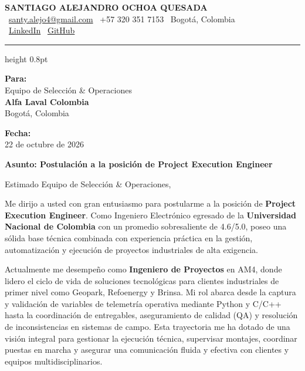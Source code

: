 \documentclass[11pt,a4paper]{article}
\begin{document}
\thispagestyle{empty}
\color{darktext}

\begin{center}
    {\Huge \bfseries\color{accent} SANTIAGO ALEJANDRO OCHOA QUESADA} \\[6pt]
    {\small\color{darktext}
    \faEnvelope\ \href{mailto:santy.alejo4@gmail.com}{santy.alejo4@gmail.com}
    \quad\textcolor{bulletline}{\textbar}\quad
    \faPhone\ +57 320 351 7153
    \quad\textcolor{bulletline}{\textbar}\quad
    \faMapMarker*\ Bogotá, Colombia \\[4pt]
    \faLinkedin\ \href{https://linkedin.com/in/santiago-alejandro-ochoa-quesada-a07a18288/}{LinkedIn}
    \quad\textcolor{bulletline}{\textbar}\quad
    \faGithub\ \href{https://github.com/Sochoaq}{GitHub}
    }
\end{center}
\vspace{2pt}
{\color{bulletline}\hrule height 0.8pt}
\vspace{10pt}

\noindent
\begin{minipage}[t]{0.62\textwidth}
    \textbf{\color{accent} Para:}\\
    Equipo de Selección \& Operaciones\\
    \textbf{Alfa Laval Colombia}\\
    Bogotá, Colombia
\end{minipage}
\hfill
\begin{minipage}[t]{0.35\textwidth}\raggedleft
    \textbf{\color{accent} Fecha:}\\
    22 de octubre de 2026
\end{minipage}

\vspace{6pt}
\noindent
{\large\bfseries\color{accent} Asunto: Postulación a la posición de Project Execution Engineer}
\vspace{2pt}

\noindent Estimado Equipo de Selección \& Operaciones,

Me dirijo a usted con gran entusiasmo para postularme a la posición de \textbf{Project Execution Engineer}. Como Ingeniero Electrónico egresado de la \textbf{Universidad Nacional de Colombia} con un promedio sobresaliente de 4.6/5.0, poseo una sólida base técnica combinada con experiencia práctica en la gestión, automatización y ejecución de proyectos industriales de alta exigencia.

Actualmente me desempeño como \textbf{Ingeniero de Proyectos} en AM4, donde lidero el ciclo de vida de soluciones tecnológicas para clientes industriales de primer nivel como Geopark, Refoenergy y Brinsa. Mi rol abarca desde la captura y validación de variables de telemetría operativa mediante Python y C/C++ hasta la coordinación de entregables, aseguramiento de calidad (QA) y resolución de inconsistencias en sistemas de campo. Esta trayectoria me ha dotado de una visión integral para gestionar la ejecución técnica, supervisar montajes, coordinar puestas en marcha y asegurar una comunicación fluida y efectiva con clientes y equipos multidisciplinarios.
\end{document}
